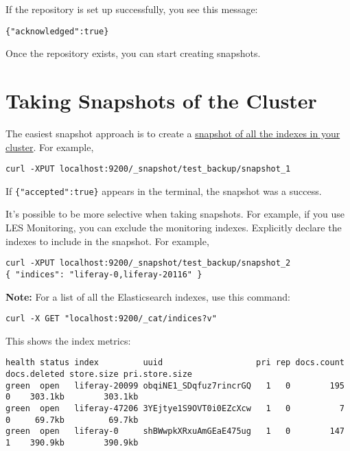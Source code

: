 If the repository is set up successfully, you see this message:

\begin{verbatim}
{"acknowledged":true}
\end{verbatim}

Once the repository exists, you can start creating snapshots.

\section{Taking Snapshots of the
Cluster}\label{taking-snapshots-of-the-cluster}

The easiest snapshot approach is to create a
\href{https://www.elastic.co/guide/en/elasticsearch/reference/7.x/snapshots-take-snapshot.html}{snapshot
of all the indexes in your cluster}. For example,

\begin{verbatim}
curl -XPUT localhost:9200/_snapshot/test_backup/snapshot_1
\end{verbatim}

If \texttt{\{"accepted":true\}} appears in the terminal, the snapshot
was a success.

It's possible to be more selective when taking snapshots. For example,
if you use LES Monitoring, you can exclude the monitoring indexes.
Explicitly declare the indexes to include in the snapshot. For example,

\begin{verbatim}
curl -XPUT localhost:9200/_snapshot/test_backup/snapshot_2
{ "indices": "liferay-0,liferay-20116" }
\end{verbatim}

\textbf{Note:} For a list of all the Elasticsearch indexes, use this
command:

\begin{verbatim}
curl -X GET "localhost:9200/_cat/indices?v"
\end{verbatim}

This shows the index metrics:

\begin{verbatim}
health status index         uuid                   pri rep docs.count docs.deleted store.size pri.store.size
green  open   liferay-20099 obqiNE1_SDqfuz7rincrGQ   1   0        195            0    303.1kb        303.1kb
green  open   liferay-47206 3YEjtye1S9OVT0i0EZcXcw   1   0          7            0     69.7kb         69.7kb
green  open   liferay-0     shBWwpkXRxuAmGEaE475ug   1   0        147            1    390.9kb        390.9kb
\end{verbatim}

